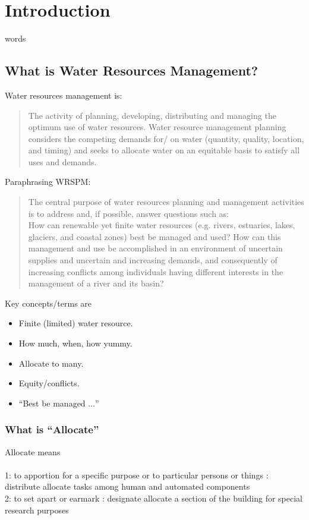 \section{Introduction}
words
\subsection{What is Water Resources Management?}
Water resources management is:
\begin{quote}The activity of planning, developing, distributing and managing the optimum use of water
resources. Water resource management planning considers the competing demands for/
on water (quantity, quality, location, and timing) and seeks to allocate water on an
equitable basis to satisfy all uses and demands.
\end{quote}

Paraphrasing WRSPM:
\begin{quote}
The central purpose of water resources planning and management activities is to
address and, if possible, answer questions such as:\\
How can renewable yet finite water resources (e.g. rivers, estuaries, lakes, glaciers, and coastal zones) best be managed and used?
How can this management and use be accomplished in an environment of uncertain supplies and uncertain and increasing demands, and consequently of increasing conflicts among individuals having different interests in the management of a river and its basin?
\end{quote}

Key concepts/terms are
\begin{itemize}
\item Finite (limited) water resource.
\item How much, when, how yummy.
\item Allocate to many.
\item Equity/conflicts.
\item ``Best be managed $\dots$''
\end{itemize}
\newpage
\subsubsection{What is ``Allocate''}
Allocate means \\~\\
1: to apportion for a specific purpose or to particular persons or things : distribute
allocate tasks among human and automated components\\
2: to set apart or earmark : designate allocate a section of the building for special
research purposes\\

